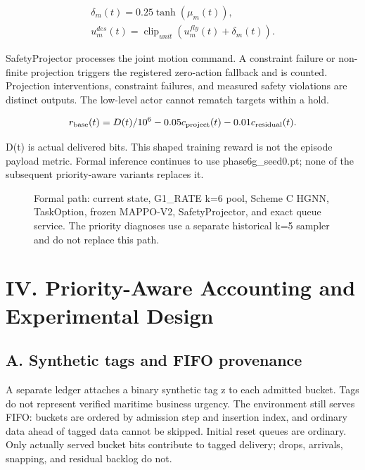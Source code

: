 \begin{equation*}
\begin{gathered}
\delta_m(t)=0.25\tanh(\mu_m(t)),\\ u_m^{des}(t)=\operatorname{clip}_{unit}(u_m^{fly}(t)+\delta_m(t)).
\end{gathered}
\end{equation*}

SafetyProjector processes the joint motion command. A constraint failure or non-finite projection triggers the registered zero-action fallback and is counted. Projection interventions, constraint failures, and measured safety violations are distinct outputs. The low-level actor cannot rematch targets within a hold.

\begin{equation*}
\begin{gathered}
r_{\rm base}(t)=D(t)/10^6-0.05c_{\rm project}(t)-0.01c_{\rm residual}(t).
\end{gathered}
\end{equation*}

D(t) is actual delivered bits. This shaped training reward is not the episode payload metric. Formal inference continues to use phase6g\_seed0.pt; none of the subsequent priority-aware variants replaces it.

\begin{figure}[tbp]
\centering

\caption{Formal path: current state, G1\_RATE k=6 pool, Scheme C HGNN, TaskOption, frozen MAPPO-V2, SafetyProjector, and exact queue service. The priority diagnoses use a separate historical k=5 sampler and do not replace this path.}
\label{fig:formal-architecture}
\end{figure}

\section*{IV. Priority-Aware Accounting and Experimental Design}

\subsection*{A. Synthetic tags and FIFO provenance}

A separate ledger attaches a binary synthetic tag z to each admitted bucket. Tags do not represent verified maritime business urgency. The environment still serves FIFO: buckets are ordered by admission step and insertion index, and ordinary data ahead of tagged data cannot be skipped. Initial reset queues are ordinary. Only actually served bucket bits contribute to tagged delivery; drops, arrivals, snapping, and residual backlog do not.

